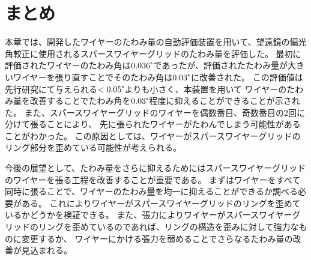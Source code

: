 \documentclass[../../main.tex]{subfiles}
\begin{document}
\section{まとめ}
本章では、開発したワイヤーのたわみ量の自動評価装置を用いて、望遠鏡の偏光角較正に使用されるスパースワイヤーグリッドのたわみ量を評価した。
最初に評価されたワイヤーのたわみ角は$0.036\tcdegree$であったが、評価されたたわみ量が大きいワイヤーを張り直すことでそのたわみ角は$0.03\tcdegree$に改善された。
この評価値は先行研究にて与えられる$<0.05\tcdegree$よりも小さく、本装置を用いて
ワイヤーのたわみ量を改善することでたわみ角を$0.03\tcdegree$程度に抑えることができることが示された。
また、スパースワイヤーグリッドのワイヤーを偶数番目、奇数番目の2回に分けて張ることにより、
先に張られたワイヤーがたわんでしまう可能性があることがわかった。
この原因としては、ワイヤーがスパースワイヤーグリッドのリング部分を歪めている可能性が考えられる。

今後の展望として、たわみ量をさらに抑えるためにはスパースワイヤーグリッドのワイヤーを張る工程を改善することが重要である。
まずはワイヤーをすべて同時に張ることで、ワイヤーのたわみ量を均一に抑えることができるか調べる必要がある。
これによりワイヤーがスパースワイヤーグリッドのリングを歪めているかどうかを検証できる。
また、張力によりワイヤーがスパースワイヤーグリッドのリングを歪めているのであれば、リングの構造を歪みに対して強力なものに変更するか、
ワイヤーにかける張力を弱めることでさらなるたわみ量の改善が見込まれる。
\end{document}
